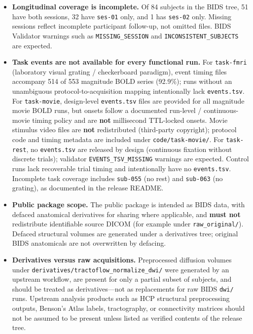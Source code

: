 \begin{itemize}
    \item \textbf{Longitudinal coverage is incomplete.}
    Of 84 subjects in the BIDS tree, 51 have both sessions, 32 have \texttt{ses-01} only, and 1 has \texttt{ses-02} only.
    Missing sessions reflect incomplete participant follow-up, not omitted files.
    BIDS Validator warnings such as \texttt{MISSING\_SESSION} and \texttt{INCONSISTENT\_SUBJECTS} are expected.

    \item \textbf{Task events are not available for every functional run.}
    For \texttt{task-fmri} (laboratory visual grating / checkerboard paradigm), event timing files accompany 514 of 553 magnitude BOLD series (92.9\%); runs without an unambiguous protocol-to-acquisition mapping intentionally lack \texttt{events.tsv}.
    For \texttt{task-movie}, design-level \texttt{events.tsv} files are provided for all magnitude movie BOLD runs, but onsets follow a documented run-level / continuous-movie timing policy and are \textbf{not} millisecond TTL-locked onsets.
    Movie stimulus video files are \textbf{not} redistributed (third-party copyright); protocol code and timing metadata are included under \texttt{code/task-movie/}.
    For \texttt{task-rest}, no \texttt{events.tsv} are released by design (continuous fixation without discrete trials); validator \texttt{EVENTS\_TSV\_MISSING} warnings are expected.
    Control runs lack recoverable trial timing and intentionally have no \texttt{events.tsv}.
    Incomplete task coverage includes \texttt{sub-055} (no rest) and \texttt{sub-063} (no grating), as documented in the release README.

    \item \textbf{Public package scope.}
    The public package is intended as BIDS data, with defaced anatomical derivatives for sharing where applicable, and \textbf{must not} redistribute identifiable source DICOM (for example under \texttt{raw\_original/}).
    Defaced structural volumes are generated under a derivatives tree; original BIDS anatomicals are not overwritten by defacing.

    \item \textbf{Derivatives versus raw acquisitions.}
    Preprocessed diffusion volumes under \texttt{derivatives/tractoflow\_normalize\_dwi/} were generated by an upstream workflow, are present for only a partial subset of subjects, and should be treated as derivatives---not as replacements for raw BIDS \texttt{dwi/} runs.
    Upstream analysis products such as HCP structural preprocessing outputs, Benson's Atlas labels, tractography, or connectivity matrices should not be assumed to be present unless listed as verified contents of the release tree.


\end{itemize}
